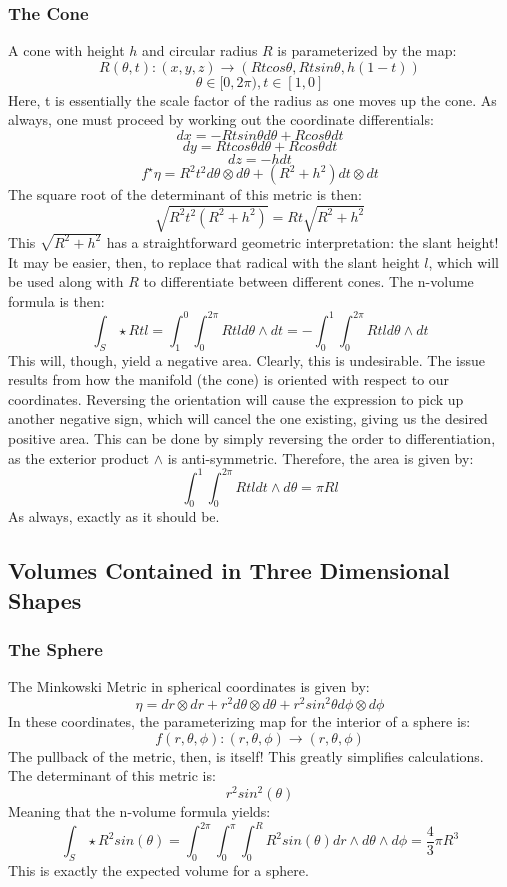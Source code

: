 \documentclass{article}
\begin{document}
\subsubsection{The Cone}
A cone with height $h$ and circular radius $R$ is parameterized by the map:
\[
R(\theta,t): (x,y,z) \rightarrow (Rt cos\theta, Rt sin\theta, h(1-t))
\]
\[
\theta \in [0, 2\pi), t \in [1, 0]
\]
Here, t is essentially the scale factor of the radius as one moves up the cone. As always, one must proceed by working out the coordinate differentials:
\[
dx = -Rt sin\theta d\theta + R cos\theta dt
\]
\[
dy = Rt cos\theta d\theta + R cos\theta dt
\]
\[
dz = -hdt
\]
\[
f^{\star}\eta = R^2 t^2 d\theta \otimes d\theta + (R^2 + h^2) dt \otimes dt
\]
The square root of the determinant of this metric is then:
\[
\sqrt{R^2t^2(R^2+h^2)} = Rt\sqrt{R^2+h^2}
\]
This $\sqrt{R^2+h^2}$ has a straightforward geometric interpretation: the slant height! It may be easier, then, to replace that radical with the slant height $l$, which will be used along with $R$ to differentiate between different cones. The n-volume formula is then:
\[
\int_S \star Rtl = \int_1^0\int_0^{2\pi} Rtl d\theta \wedge dt = -\int_0^1\int_0^{2\pi} Rtl d\theta \wedge dt
\]
This will, though, yield a negative area. Clearly, this is undesirable. The issue results from how the manifold (the cone) is oriented with respect to our coordinates. Reversing the orientation will cause the expression to pick up another negative sign, which will cancel the one existing, giving us the desired positive area. This can be done by simply reversing the order to differentiation, as the exterior product $\wedge$ is anti-symmetric. Therefore, the area is given by:
\[
\int_0^1\int_0^{2\pi} Rtl dt \wedge d\theta = \pi Rl
\]
As always, exactly as it should be.

\subsection{Volumes Contained in Three Dimensional Shapes}
\subsubsection{The Sphere}
The Minkowski Metric in spherical coordinates is given by:
\[
\eta = dr \otimes dr + r^2 d\theta \otimes d\theta + r^2 sin^2\theta d\phi \otimes d\phi
\]
In these coordinates, the parameterizing map for the interior of a sphere is:
\[
f(r, \theta, \phi):(r,\theta, \phi) \rightarrow (r, \theta, \phi)
\]
The pullback of the metric, then, is itself! This greatly simplifies calculations. The determinant of this metric is:
\[
r^2 sin^2 (\theta)
\]
Meaning that the n-volume formula yields:
\[
\int_S \star R^2 sin(\theta) = \int_{0}^{2\pi}\int_{0}^{\pi}\int_{0}^{R}R^2 sin(\theta) dr \wedge d\theta \wedge d\phi = \frac{4}{3}\pi R^3
\]
This is exactly the expected volume for a sphere.
\end{document}
